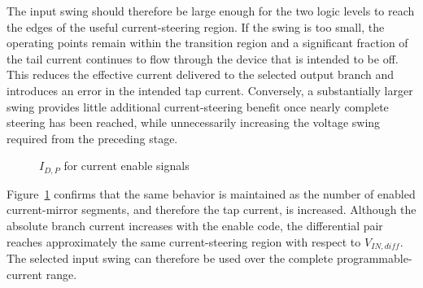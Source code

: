 The input swing should therefore be large enough for the two logic levels to reach the edges of the useful current-steering region. If the swing is too small, the operating points remain within the transition region and a significant fraction of the tail current continues to flow through the device that is intended to be off. This reduces the effective current delivered to the selected output branch and introduces an error in the intended tap current. Conversely, a substantially larger swing provides little additional current-steering benefit once nearly complete steering has been reached, while unnecessarily increasing the voltage swing required from the preceding stage.

\begin{figure}[H]
	\centering
	\caption{$I_{D,P}$ for current enable signals}\label{fig:diff_pair_idiff_vs_en}
\end{figure}

Figure~\ref{fig:diff_pair_idiff_vs_en} confirms that the same behavior is maintained as the number of enabled current-mirror segments, and therefore the tap current, is increased. Although the absolute branch current increases with the enable code, the differential pair reaches approximately the same current-steering region with respect to $V_{IN,diff}$. The selected input swing can therefore be used over the complete programmable-current range.

